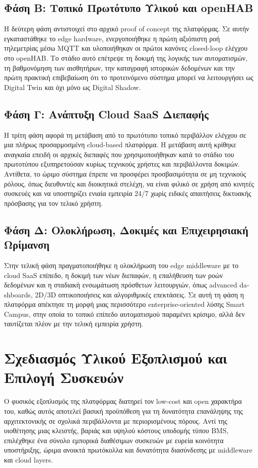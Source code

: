 \subsection{Φάση Β: Τοπικό Πρωτότυπο Υλικού και openHAB}
Η δεύτερη φάση αντιστοιχεί στο αρχικό \textlatin{proof of concept} της πλατφόρμας. Σε αυτήν εγκαταστάθηκε το \textlatin{edge hardware}, ενεργοποιήθηκε η πρώτη αξιόπιστη ροή τηλεμετρίας μέσω \textlatin{MQTT} και υλοποιήθηκαν οι πρώτοι κανόνες \textlatin{closed-loop} ελέγχου στο \textlatin{openHAB}. Το στάδιο αυτό επέτρεψε τη δοκιμή της λογικής των αυτοματισμών, τη βαθμονόμηση των αισθητήρων, την καταγραφή ιστορικών δεδομένων και την πρώτη πρακτική επιβεβαίωση ότι το προτεινόμενο σύστημα μπορεί να λειτουργήσει ως \textlatin{Digital Twin} και όχι μόνο ως \textlatin{Digital Shadow}.

\subsection{Φάση Γ: Ανάπτυξη Cloud SaaS Διεπαφής}
Η τρίτη φάση αφορά τη μετάβαση από το πρωτότυπο τοπικό περιβάλλον ελέγχου σε μια πλήρως προσαρμοσμένη \textlatin{cloud-based} πλατφόρμα. Η μετάβαση αυτή κρίθηκε αναγκαία επειδή οι αρχικές διεπαφές που χρησιμοποιήθηκαν κατά το στάδιο του πρωτοτύπου εξυπηρετούσαν κυρίως τεχνικούς χρήστες και περιβάλλοντα δοκιμών. Αντίθετα, το ώριμο σύστημα έπρεπε να προσφέρει προσβασιμότητα σε μη τεχνικούς ρόλους, όπως διευθυντές και διοικητικά στελέχη, να είναι φιλικό σε χρήση από κινητές συσκευές και να υποστηρίζει ενιαία εμπειρία 24/7 χωρίς ειδικές απαιτήσεις δικτυακής πρόσβασης για τον τελικό χρήστη.

\subsection{Φάση Δ: Ολοκλήρωση, Δοκιμές και Επιχειρησιακή Ωρίμανση}
Στην τελική φάση πραγματοποιήθηκε η ολοκλήρωση του \textlatin{edge middleware} με το \textlatin{cloud SaaS} επίπεδο, η δοκιμή των νέων διεπαφών, η επαλήθευση των ροών δεδομένων και η σταδιακή ενσωμάτωση πρόσθετων λειτουργιών, όπως \textlatin{advanced dashboards}, \textlatin{2D/3D} οπτικοποιήσεις και αλγοριθμικές επεκτάσεις. Σε αυτή τη φάση η πλατφόρμα απέκτησε τη μορφή μιας περισσότερο \textlatin{enterprise-oriented} λύσης \textlatin{Smart Campus}, στην οποία το τοπικό επίπεδο αυτοματισμού παραμένει κρίσιμο, αλλά δεν ταυτίζεται πλέον με την τελική εμπειρία χρήστη.

\section{Σχεδιασμός Υλικού Εξοπλισμού και Επιλογή Συσκευών}
Ο φυσικός εξοπλισμός της πλατφόρμας διατηρεί τον \textlatin{low-cost} και \textlatin{open} χαρακτήρα του, καθώς αυτός αποτελεί βασική προϋπόθεση για τη δυνατότητα επανάληψης της αρχιτεκτονικής σε σχολικά περιβάλλοντα με περιορισμένους πόρους. Αντί της υιοθέτησης μιας κλειστής, βαριάς και υψηλού κόστους υποδομής τύπου \textlatin{BMS}, επιλέχθηκε ένα σύνολο εμπορικά διαθέσιμων συσκευών με ευρεία κοινότητα υποστήριξης, ώριμα ανοικτά πρωτόκολλα και δυνατότητα διασύνδεσης με \textlatin{middleware} και \textlatin{cloud layers}.

